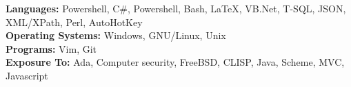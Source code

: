 

\begin{cvparagraph}

   \begin{tabbing}

      \textbf{Languages:}
      Powershell, C\#, Powershell, Bash, \LaTeX, VB.Net, T-SQL, JSON, XML/XPath, Perl, AutoHotKey \\

      \textbf{Operating Systems:} 
      Windows, GNU/Linux, Unix \\
      
      \textbf{Programs:} 
      Vim, Git \\

      \textbf{Exposure To:}
      Ada, Computer security, FreeBSD, CLISP, Java, Scheme, MVC, Javascript

   \end{tabbing}

\end{cvparagraph}

